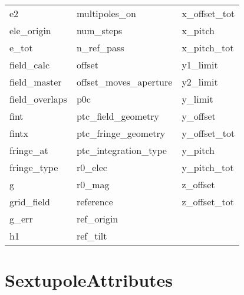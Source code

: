 \begin{tabular}{lll}
e2                          & multipoles_on               & x_offset_tot                \\
ele_origin                  & num_steps                   & x_pitch                     \\
e_tot                       & n_ref_pass                  & x_pitch_tot                 \\
field_calc                  & offset                      & y1_limit                    \\
field_master                & offset_moves_aperture       & y2_limit                    \\
field_overlaps              & p0c                         & y_limit                     \\
fint                        & ptc_field_geometry          & y_offset                    \\
fintx                       & ptc_fringe_geometry         & y_offset_tot                \\
fringe_at                   & ptc_integration_type        & y_pitch                     \\
fringe_type                 & r0_elec                     & y_pitch_tot                 \\
g                           & r0_mag                      & z_offset                    \\
grid_field                  & reference                   & z_offset_tot                \\
g_err                       & ref_origin                  &                             \\
h1                          & ref_tilt                    &                             \\
 \bottomrule
 \end{tabular}
 \vfill
 
 \section{SextupoleAttributes}
 \label{s:list.sextupole}
 
